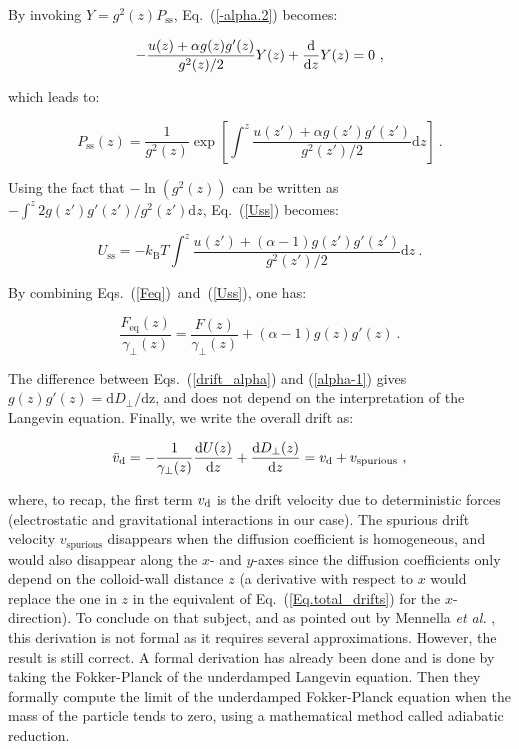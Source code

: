 By invoking $Y=g^2(z)P_\mathrm{ss}$, Eq.~(\ref{-alpha.2}) becomes:

\begin{equation}
	-\frac{u(z) + \alpha g(z)g'(z)}{g^2(z) / 2} Y(z) + \frac{\textnormal{d} }{\textnormal{d} z} Y(z)=0~,
\end{equation}

which leads to:

\begin{equation}
	P_\mathrm{ss}(z) = \frac{1}{g^2(z)} \exp \left[ \int^{z} \frac{u(z') + \alpha g(z')g'(z')}{g^2(z') / 2} \mathrm{d}z \right] ~.
	\label{-alpha.3}
\end{equation}

Using the fact that $-\ln(g^2(z))$ can be written as $-\int^{z} 2 g(z')g'(z') / g^2(z') \mathrm{d}z$, Eq.~(\ref{Uss}) becomes:

\begin{equation}
	U_\mathrm{ss} = -k_\mathrm{B}T \int^{z} \frac{u(z') + (\alpha - 1) g(z')g'(z')}{g^2(z') / 2} \mathrm{d}z~.
\end{equation}



By combining Eqs.~(\ref{Feq})~and~(\ref{Uss}), one has:

\begin{equation}
	\frac{F_\mathrm{eq}(z)}{\gamma_\bot(z)} = \frac{F(z)}{\gamma_\bot(z)} + (\alpha - 1)g(z)g'(z)~.
	\label{alpha-1}
\end{equation}

The difference between Eqs.~(\ref{drift_alpha}) and (\ref{alpha-1}) gives $g(z)g'(z) = \mathrm{d}D_\bot/ \mathrm{dz}$, and does not depend on the interpretation of the Langevin equation. Finally, we write the overall drift as:

\begin{equation}
	\bar{v}_\mathrm{d} = -\frac{1}{\gamma_\bot(z)} \frac{\textnormal{d} U(z)}{\textnormal{d} z} + \frac{\mathrm{d} D_\bot(z)}{\mathrm{d}z}  = v_\mathrm{d} + v_\mathrm{spurious}~,
	\label{Eq.total_drifts}
\end{equation}

where, to recap, the first term $v_\textnormal{d}$ is the drift velocity due to deterministic forces (electrostatic and gravitational interactions in our case). The spurious drift velocity $v_\mathrm{spurious}$ disappears when the diffusion coefficient is homogeneous, and would also disappear along the $x$- and $y$-axes since the diffusion coefficients only depend on the colloid-wall distance $z$ (a derivative with respect to $x$ would replace the one in $z$ in the equivalent of Eq.~(\ref{Eq.total_drifts}) for the $x$-direction). To conclude on that subject, and as pointed out by Mennella \textit{et al.} \cite{mannella_ito_2012}, this derivation is not formal as it requires several approximations. However, the result is still correct. A formal derivation has already been done \cite{sancho_adiabatic_1982} and is done by taking the Fokker-Planck of the underdamped Langevin equation. Then they formally compute the limit of the underdamped Fokker-Planck equation when the mass of the particle tends to zero, using a mathematical method called adiabatic reduction.


